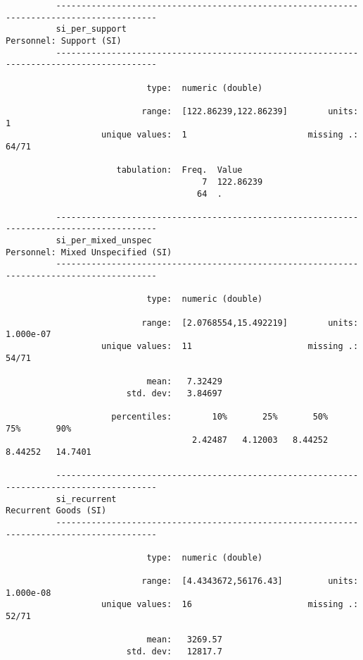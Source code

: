 \documentclass{article}
\begin{document}
\begin{verbatim}
          ------------------------------------------------------------------------------------------
          si_per_support                                                     Personnel: Support (SI)
          ------------------------------------------------------------------------------------------
          
                            type:  numeric (double)
          
                           range:  [122.86239,122.86239]        units:  1
                   unique values:  1                        missing .:  64/71
          
                      tabulation:  Freq.  Value
                                       7  122.86239
                                      64  .
          
          ------------------------------------------------------------------------------------------
          si_per_mixed_unspec                                      Personnel: Mixed Unspecified (SI)
          ------------------------------------------------------------------------------------------
          
                            type:  numeric (double)
          
                           range:  [2.0768554,15.492219]        units:  1.000e-07
                   unique values:  11                       missing .:  54/71
          
                            mean:   7.32429
                        std. dev:   3.84697
          
                     percentiles:        10%       25%       50%       75%       90%
                                     2.42487   4.12003   8.44252   8.44252   14.7401
          
          ------------------------------------------------------------------------------------------
          si_recurrent                                                          Recurrent Goods (SI)
          ------------------------------------------------------------------------------------------
          
                            type:  numeric (double)
          
                           range:  [4.4343672,56176.43]         units:  1.000e-08
                   unique values:  16                       missing .:  52/71
          
                            mean:   3269.57
                        std. dev:   12817.7
          

\end{verbatim}
\end{document}
